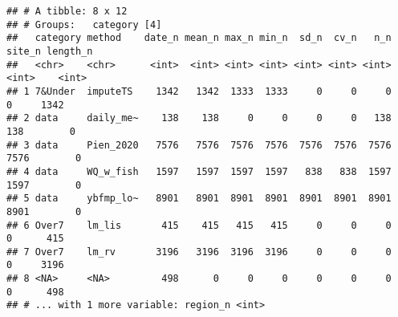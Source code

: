 \documentclass[
]{article}
\begin{document}
\begin{verbatim}
## # A tibble: 8 x 12
## # Groups:   category [4]
##   category method    date_n mean_n max_n min_n  sd_n  cv_n   n_n site_n length_n
##   <chr>    <chr>      <int>  <int> <int> <int> <int> <int> <int>  <int>    <int>
## 1 7&Under  imputeTS    1342   1342  1333  1333     0     0     0      0     1342
## 2 data     daily_me~    138    138     0     0     0     0   138    138        0
## 3 data     Pien_2020   7576   7576  7576  7576  7576  7576  7576   7576        0
## 4 data     WQ_w_fish   1597   1597  1597  1597   838   838  1597   1597        0
## 5 data     ybfmp_lo~   8901   8901  8901  8901  8901  8901  8901   8901        0
## 6 Over7    lm_lis       415    415   415   415     0     0     0      0      415
## 7 Over7    lm_rv       3196   3196  3196  3196     0     0     0      0     3196
## 8 <NA>     <NA>         498      0     0     0     0     0     0      0      498
## # ... with 1 more variable: region_n <int>
\end{verbatim}
\end{document}
